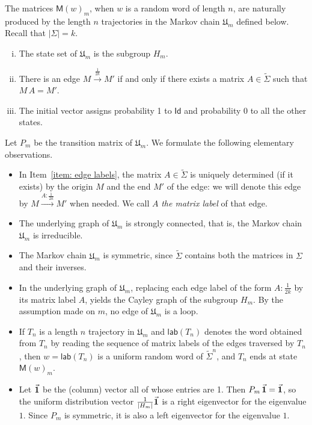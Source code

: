 \documentclass{article}
\def\alph{\tilde{\Sigma}}
\def\Id{\textsf{Id}}
\def\U{\mathfrak{U}}
\def\lab{\textsf{lab}}
\def\mat{\textsf{M}}
\theoremstyle{plain}
\theoremstyle{definition}
\begin{document}
The matrices $\mat(w)_m$, when $w$ is a random word of length $n$, are naturally produced by the length $n$ trajectories in the Markov chain $\U_m$ defined below.
Recall that $|\Sigma| = k$.
%
\begin{enumerate}[(i)]
%
\item The state set of $\U_m$ is the subgroup $H_m$.
%
\item\label{item: edge labels} There is an edge $M\xrightarrow{\frac{1}{2k}} M'$ if and only if there exists a matrix $A\in\alph$ such that $M\, A = M'$.
%
\item The initial vector assigns probability 1 to $\Id$ and probability 0 to all the other states.
%
\end{enumerate}
%
Let $P_m$ be the transition matrix of $\U_m$. We formulate the following elementary observations.
%
\begin{itemize}
    \item In Item~\eqref{item: edge labels}, the matrix $A \in \alph$ is uniquely determined (if it exists) by the origin $M$ and the end $M'$ of the edge: we will denote this edge by $M\xrightarrow{A:\frac{1}{2k}} M'$ when needed. We call $A$ \emph{the matrix label} of that edge.
    \item The underlying graph of $\U_m$ is strongly connected, that is, the Markov chain $\U_m$ is irreducible.
    \item The Markov chain $\U_m$ is symmetric, since $\alph$ contains both the matrices in $\Sigma$ and their inverses.
    
    \item In the underlying graph of $\U_m$, replacing each edge label of the form $A:\frac{1}{2k}$ by its matrix label $A$, yields the Cayley graph of the subgroup $H_m$. By the assumption made on $m$, no edge of $\U_m$ is a loop. 
    \item If $T_n$ is a length $n$ trajectory in $\U_m$ and $\lab(T_n)$ denotes the word obtained from $T_n$ by reading the sequence of matrix labels of the edges traversed by $T_n$, then $w = \lab(T_n)$ is a uniform random word of $\alph^n$, and $T_n$ ends at state $\mat(w)_m$.
    \item Let $\vec{\bf 1}$ be the (column) vector all of whose entries are 1. Then $P_m\, \vec{\bf 1} = \vec{\bf 1}$, so the uniform distribution vector $\frac1{|H_m|}\vec{\bf 1}$ is a right eigenvector for the eigenvalue $1$. Since $P_m$ is symmetric, it is also a left eigenvector for the eigenvalue $1$. 
\end{itemize}
\end{document}
